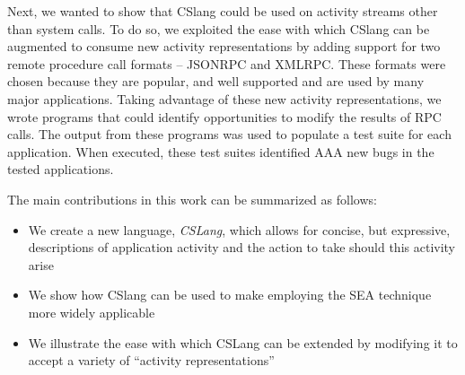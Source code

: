 Next, we wanted to
show that CSlang
could be used on activity streams
other than system calls.
To do so,
we exploited the ease with which
CSlang can be augmented
to consume new activity representations
by adding support for two remote procedure call formats -- JSONRPC and XMLRPC.
These formats were chosen
because they are popular,
and well supported and are
used by many major applications.
Taking advantage of these new activity representations,
we wrote programs
that could identify opportunities
to modify the results of RPC calls.
The output from these programs was used to populate a test suite
for each application.
When executed, these test suites identified AAA new bugs in the tested applications.

The main contributions in this work can be summarized as follows:

\begin{itemize}

\item{We create a new language, {\em CSLang},
  which allows for concise, but expressive, descriptions of
    application activity and the action to take should this activity arise}

\item{We show how CSlang can be used to make employing the SEA technique
  more widely applicable}

\item{We illustrate the ease with which CSLang can be extended by modifying
  it to accept a variety of ``activity representations''}

\end{itemize}

